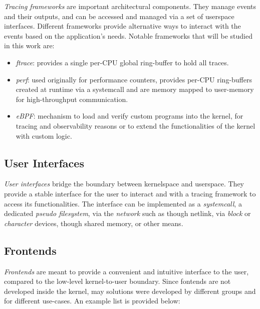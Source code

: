 \textit{Tracing frameworks} are important architectural components. They manage
events and their outputs, and can be accessed and managed via a set of userspace
interfaces. Different frameworks provide alternative ways to interact with the
events based on the application's needs. Notable frameworks that will be studied
in this work are:

\begin{itemize}

  \item \textit{ftrace}: provides a single per-CPU global ring-buffer to hold
    all traces.

  \item \textit{perf}: used originally for performance counters, provides
    per-CPU ring-buffers created at runtime via a systemcall and are memory
    mapped to user-memory for high-throughput communication.

  \item \textit{eBPF}: mechanism to load and verify custom programs into the
    kernel, for tracing and observability reasons or to extend the
    functionalities of the kernel with custom logic.

\end{itemize}

\subsection{User Interfaces}

\textit{User interfaces} bridge the boundary between kernelspace and userspace.
They provide a stable interface for the user to interact and with a tracing
framework to access its functionalities. The interface can be implemented as a
\textit{systemcall}, a dedicated \textit{pseudo filesystem}, via the
\textit{network} such as though netlink, via \textit{block} or
\textit{character} devices, though shared memory, or other means.

\subsection{Frontends}

\textit{Frontends} are meant to provide a convenient and intuitive interface to
the user, compared to the low-level kernel-to-user boundary. Since fontends are
not developed inside the kernel, may solutions were developed by different
groups and for different use-cases. An example list is provided below:


